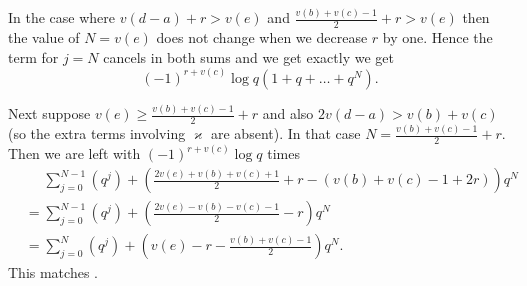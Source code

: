 \begin{itemize}
\ii In the case where $v(d-a)+r > v(e)$
and $\frac{v(b)+v(c)-1}{2} + r > v(e)$
then the value of $N = v(e)$ does not change when we decrease $r$ by one.
Hence the term for $j = N$ cancels in both sums and we get exactly
we get \[ (-1)^{r+v(c)} \log q (1 + q + \dots + q^N). \]

\ii Next suppose $v(e) \ge \frac{v(b)+v(c)-1}{2} + r$
and also $2v(d-a) > v(b) + v(c)$ (so the extra terms involving $\varkappa$ are absent).
In that case $N = \frac{v(b) + v(c) - 1}{2} + r$.
Then we are left with $(-1)^{r+v(c)} \log q$ times
\begin{align*}
  &\phantom= \sum_{j=0}^{N-1} (q^j) + \left( \frac{2v(e)+v(b)+v(c)+1}{2} + r - (v(b)+v(c)-1+2r) \right) q^N \\
  &= \sum_{j=0}^{N-1} (q^j) + \left( \frac{2v(e)-v(b)-v(c)-1}{2} - r \right) q^N \\
  &= \sum_{j=0}^{N} (q^j) + \left( v(e) - r - \frac{v(b)+v(c)-1}{2} \right) q^N.
\end{align*}
This matches .


\end{itemize}
